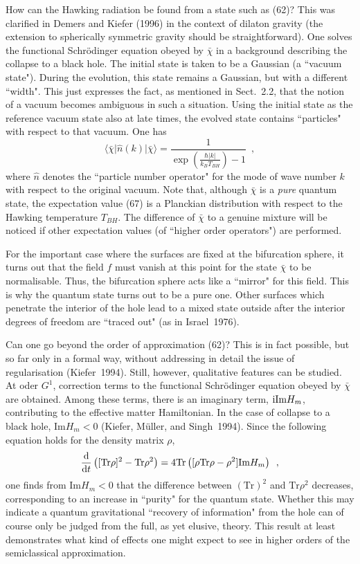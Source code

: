 \documentclass[12pt]{article}
\def\D{{\rm d}}
\def\I{{\rm i}}
\newcommand{\be}{\begin{equation}}
\newcommand{\ee}{\end{equation}}
\begin{document}
How can the Hawking radiation be found from a state such as (62)?
This was clarified in Demers and Kiefer (1996) in the context
of dilaton gravity (the extension to spherically symmetric
gravity should be straightforward). One solves the functional
Schr\"odinger equation obeyed by $\bar{\chi}$ in a background
describing the collapse to a black hole. The initial state
is taken to be a Gaussian (a ``vacuum state"). During the evolution,
this state remains a Gaussian, but with a different ``width".
This just expresses the fact, as mentioned in Sect.~2.2,
that the notion of a vacuum becomes ambiguous in such a situation.
Using the initial state as the reference vacuum state also at
late times, the evolved state contains ``particles" with respect
to that vacuum. One has
\be \langle\bar{\chi}\vert\hat{n}(k)\vert\bar{\chi}\rangle
     =\frac{1}{\exp\left(\frac{\hbar\vert k\vert}{k_BT_{BH}}\right)
      -1}\enspace , \ee
where $\hat{n}$ denotes the ``particle number operator"
for the mode of wave number $k$ with respect to the
original vacuum. Note that, although $\bar{\chi}$ is a
{\em pure} quantum state, the expectation value (67) is a Planckian
distribution with respect to the Hawking temperature $T_{BH}$.
The difference of $\bar{\chi}$ to a genuine mixture will be noticed
if other expectation values (of ``higher order operators")
are performed.

For the important case where the surfaces are fixed at the
bifurcation sphere, it turns out that the field $f$ must vanish
at this point for the state $\bar{\chi}$ to be normalisable.
Thus, the bifurcation sphere acts like a ``mirror" for this field.
This is why the quantum state turns out to be a pure one.
Other surfaces which penetrate the interior of the hole
lead to a mixed state outside after the interior degrees of
freedom are ``traced out" (as in Israel~1976).

Can one go beyond the order of approximation (62)?
This is in fact possible, but so far only in a formal way,
without addressing in detail the issue of regularisation
(Kiefer~1994). Still, however, qualitative features can be studied.
At oder $G^1$, correction terms to the functional Schr\"odinger
equation obeyed by $\bar{\chi}$ are obtained. Among these terms,
there is an imaginary term, $\I\mbox{Im}H_m$, contributing
to the effective matter Hamiltonian. In the case of collapse to a
black hole, $\mbox{Im}H_m<0$ (Kiefer, M\"uller, and Singh~1994).
Since the following equation holds for the density matrix $\rho$,
\be \frac{\D}{\D t}\left([\mbox{Tr}\rho]^2-\mbox{Tr}\rho^2\right)
    =4\mbox{Tr}\left([\rho\mbox{Tr}\rho-\rho^2]\mbox{Im}H_m\right)
    \enspace , \ee
one finds from $\mbox{Im}H_m<0$ that the difference between
$(\mbox{Tr})^2$ and $\mbox{Tr}\rho^2$ decreases, corresponding
to an increase in ``purity" for the quantum state. 
Whether this may indicate a quantum gravitational ``recovery of
information" from the hole can of course only be judged from
the full, as yet elusive, theory. This result at least 
demonstrates what kind of effects one might expect to see
in higher orders of the semiclassical approximation.
\end{document}

